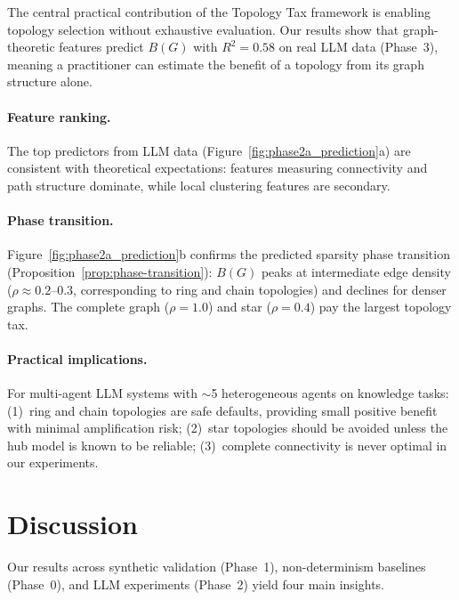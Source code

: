 \documentclass{article}
\begin{document}
The central practical contribution of the Topology Tax framework is enabling topology selection without exhaustive evaluation. Our results show that graph-theoretic features predict $B(G)$ with $R^2 = 0.58$ on real LLM data (Phase~3), meaning a practitioner can estimate the benefit of a topology from its graph structure alone.

\paragraph{Feature ranking.} The top predictors from LLM data (Figure~\ref{fig:phase2a_prediction}a) are consistent with theoretical expectations: features measuring connectivity and path structure dominate, while local clustering features are secondary.

\paragraph{Phase transition.} Figure~\ref{fig:phase2a_prediction}b confirms the predicted sparsity phase transition (Proposition~\ref{prop:phase-transition}): $B(G)$ peaks at intermediate edge density ($\rho \approx 0.2\text{--}0.3$, corresponding to ring and chain topologies) and declines for denser graphs. The complete graph ($\rho = 1.0$) and star ($\rho = 0.4$) pay the largest topology tax.

\paragraph{Practical implications.} For multi-agent LLM systems with $\sim$5 heterogeneous agents on knowledge tasks: (1)~ring and chain topologies are safe defaults, providing small positive benefit with minimal amplification risk; (2)~star topologies should be avoided unless the hub model is known to be reliable; (3)~complete connectivity is never optimal in our experiments.

\section{Discussion}
\label{sec:discussion}

Our results across synthetic validation (Phase~1), non-determinism baselines (Phase~0), and LLM experiments (Phase~2) yield four main insights.
\end{document}
